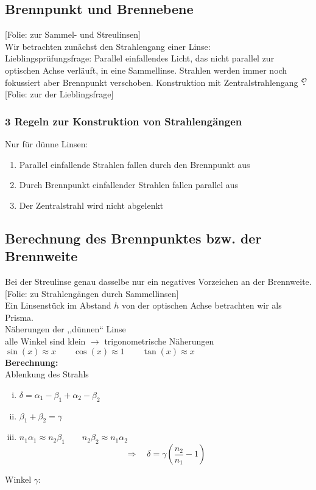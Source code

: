 \documentclass[titlepage,11pt,a4paper,ngerman]{report}
\newcommand{\folie}[1]{\color{gray}[Folie: #1]\color{black}}
\newcommand{\lcom}[1]{\color{MidnightBlue}#1\color{black}}
\newcommand{\mau}{$\buildrel \mathcal{O} \over{\textbf{.}}$}
\begin{document}
\subsection{Brennpunkt und Brennebene}
\folie{zur Sammel- und Streulinsen}\\
Wir betrachten zunächst den Strahlengang einer Linse:\\

\noindent
\lcom{Lieblingsprüfungsfrage: Parallel einfallendes Licht, das nicht parallel zur optischen Achse verläuft, in eine Sammellinse. Strahlen werden immer noch fokussiert aber Brennpunkt verschoben. Konstruktion mit Zentralstrahlengang \mau}\\
\folie{zur der Lieblingsfrage}

\subsubsection{3 Regeln zur Konstruktion von Strahlengängen}
Nur für dünne Linsen:
\begin{enumerate}[1)]
	\item Parallel einfallende Strahlen fallen durch den Brennpunkt aus
	\item Durch Brennpunkt einfallender Strahlen fallen parallel aus
	\item Der Zentralstrahl wird nicht abgelenkt
\end{enumerate}

\subsection{Berechnung des Brennpunktes bzw. der Brennweite}
\lcom{Bei der Streulinse genau dasselbe nur ein negatives Vorzeichen an der Brennweite.}\\
\folie{zu Strahlengängen durch Sammellinsen}\\[5pt]
Ein Linsenstück im Abstand $ h $ von der optischen Achse betrachten wir als Prisma.\\[5pt]
Näherungen der ,,dünnen`` Linse\\[5pt]
alle Winkel sind klein $ \rightarrow $ trigonometrische Näherungen\\
$ \sin(x) \approx x \qquad \cos(x) \approx 1 \qquad \tan(x) \approx x $\\[5pt]
\textbf{Berechnung:}\\
Ablenkung des Strahls


\begin{enumerate}[(i)]
	\item $ \delta = \alpha_1 - \beta_1 + \alpha_2 - \beta_2 $
	\item $ \beta_1 + \beta_2 = \gamma $
	\item $ n_1 \alpha_1 \approx n_2 \beta_1 \qquad n_2 \beta_2 \approx n_1 \alpha_2 $
	\begin{equation*}
	\Rightarrow \quad \delta = \gamma\left(\frac{n_2}{n_1} - 1\right)
	\end{equation*}
\end{enumerate}
Winkel $ \gamma $: 
\end{document}
